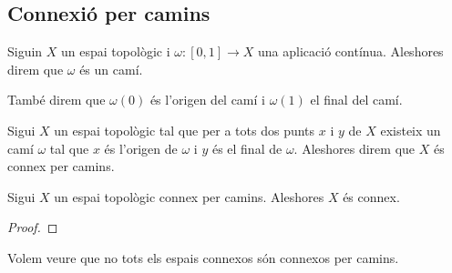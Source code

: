 \documentclass[../../Main.tex]{subfiles}
\begin{document}
	\subsection{Connexió per camins}
	\begin{definition}[Camí]
		\label{de:camí}
		\label{def:orígen d'un camí}
		\label{def:final d'un camí}
		Siguin \(X\) un espai topològic i \(\omega\colon[0,1]\longrightarrow X\) una aplicació contínua. Aleshores direm que \(\omega\) és un camí.
		
		També direm que \(\omega(0)\) és l'origen del camí i \(\omega(1)\) el final del camí.
	\end{definition}
	\begin{definition}
		\label{connexió per camins}\label{def:connexió per camins}
		Sigui \(X\) un espai topològic tal que per a tots dos punts \(x\) i \(y\) de \(X\) existeix un camí \(\omega\) tal que \(x\) és l'origen de \(\omega\) i \(y\) és el final de \(\omega\). Aleshores direm que \(X\) és connex per camins.
	\end{definition}
	\begin{proposition}
		\label{prop:els connexos per camins són connexos}
		Sigui \(X\) un espai topològic connex per camins. Aleshores \(X\) és connex.
		\begin{proof}
		\end{proof}
	\end{proposition}
	\begin{example}
		\label{ex:no tots els espais connexos són connexos per camins}
		Volem veure que no tots els espais connexos són connexos per camins.
		\begin{solution}
		\end{solution}
	\end{example}
\end{document}

